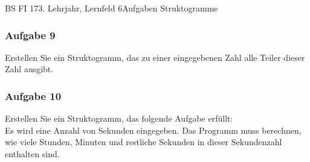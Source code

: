 \documentclass[oneside,openany,headings=optiontotoc,11pt,numbers=noenddot,Nassi]{scrreprt}
\begin{document}
\begin{worksheet}{BS FI 17}{3. Lehrjahr, Lernfeld 6}{Aufgaben Struktogramme}
\begin{framed}
			\subsubsection*{Aufgabe 9}
			Erstellen Sie ein Struktogramm, das zu einer eingegebenen Zahl alle Teiler dieser Zahl ausgibt.
			\subsubsection*{Aufgabe 10}
			Erstellen Sie ein Struktogramm, das folgende Aufgabe erfüllt:\\
			Es wird eine Anzahl von Sekunden eingegeben. Das Programm muss berechnen, wie viele Stunden, Minuten und restliche Sekunden in dieser Sekundenzahl enthalten sind.
		\end{framed}
	\end{worksheet}
\end{document}
